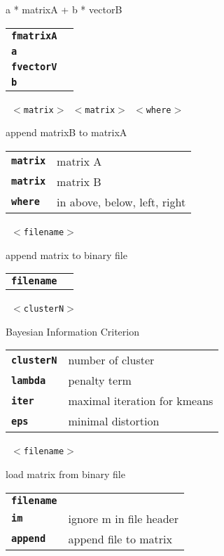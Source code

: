 \begin{description}
\begin{description}
        a * matrixA + b * vectorB

      \begin{tabular}{ll}
 \texttt{\textbf{fmatrixA}} &  \\
 \texttt{\textbf{a}} &           \\
 \texttt{\textbf{fvectorV}} &  \\
 \texttt{\textbf{b}} &           \\
      \end{tabular}
       \texttt{ $<$matrix$>$ $<$matrix$>$ $<$where$>$} \

        append matrixB to matrixA

      \begin{tabular}{ll}
 \texttt{\textbf{matrix}} &  matrix A \\
 \texttt{\textbf{matrix}} &  matrix B \\
 \texttt{\textbf{where}} &   in {above, below, left, right}  \\
      \end{tabular}
       \texttt{ $<$filename$>$} \

        append matrix to binary file

      \begin{tabular}{ll}
 \texttt{\textbf{filename}} &    \\
      \end{tabular}
       \texttt{ $<$clusterN$>$   } \

        Bayesian Information Criterion

      \begin{tabular}{ll}
 \texttt{\textbf{clusterN}} & number of cluster  \\
 \texttt{\textbf{lambda}} &   penalty term  \\
 \texttt{\textbf{iter}} &     maximal iteration for kmeans  \\
 \texttt{\textbf{eps}} &      minimal distortion  \\
      \end{tabular}
       \texttt{ $<$filename$>$  } \

        load matrix from binary file

      \begin{tabular}{ll}
 \texttt{\textbf{filename}} &    \\
 \texttt{\textbf{im}} &         ignore m in file header  \\
 \texttt{\textbf{append}} &     append file to matrix  \\
      \end{tabular}
       \texttt{} \


\end{description}
\end{description}
